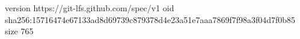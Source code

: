 version https://git-lfs.github.com/spec/v1
oid sha256:15716474e67133ad8d69739c879378d4e23a51e7aaa7869f7f98a3f04d7f0b85
size 765
